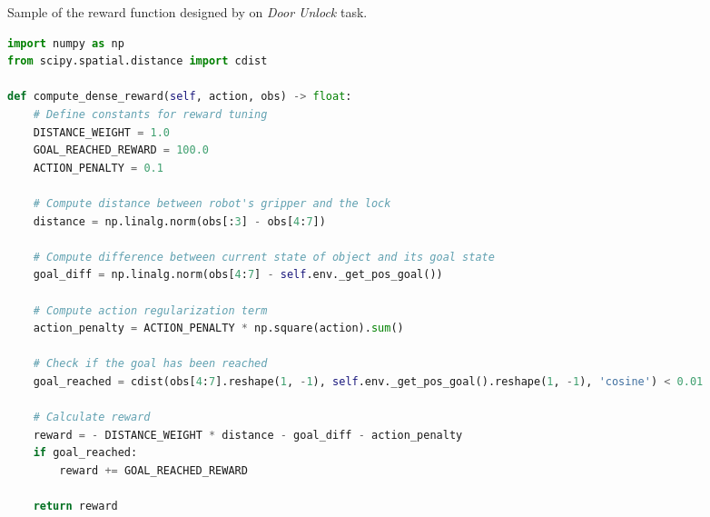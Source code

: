 \documentclass{article}
\theoremstyle{plain}
\theoremstyle{definition}
\theoremstyle{remark}
\begin{document}
\begin{table}[!ht]
\centering
\caption{Sample of the reward function designed by \tr on \MW \textit{Door Unlock} task.}
\begin{tcolorbox}
\begin{lstlisting}[language=python,breaklines]
import numpy as np
from scipy.spatial.distance import cdist

def compute_dense_reward(self, action, obs) -> float:
    # Define constants for reward tuning
    DISTANCE_WEIGHT = 1.0
    GOAL_REACHED_REWARD = 100.0
    ACTION_PENALTY = 0.1

    # Compute distance between robot's gripper and the lock
    distance = np.linalg.norm(obs[:3] - obs[4:7])

    # Compute difference between current state of object and its goal state
    goal_diff = np.linalg.norm(obs[4:7] - self.env._get_pos_goal())

    # Compute action regularization term
    action_penalty = ACTION_PENALTY * np.square(action).sum()

    # Check if the goal has been reached
    goal_reached = cdist(obs[4:7].reshape(1, -1), self.env._get_pos_goal().reshape(1, -1), 'cosine') < 0.01

    # Calculate reward
    reward = - DISTANCE_WEIGHT * distance - goal_diff - action_penalty
    if goal_reached:
        reward += GOAL_REACHED_REWARD

    return reward
\end{lstlisting}
\end{tcolorbox}
\label{tab:text2reward_code_doorunlock}
\end{table}
\end{document}
